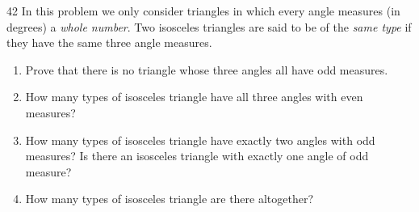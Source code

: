 \begin{probbox}{42}{}
In this problem we only consider triangles in which every angle measures (in degrees) a \emph{whole number}. Two isosceles triangles are said to be of the \emph{same type} if they have the same three angle measures.
\begin{enumerate}[label=\alph*),leftmargin=1.6em,itemsep=1pt]
\item Prove that there is no triangle whose three angles all have odd measures.
\item How many types of isosceles triangle have all three angles with even measures?
\item How many types of isosceles triangle have exactly two angles with odd measures? Is there an isosceles triangle with exactly one angle of odd measure?
\item How many types of isosceles triangle are there altogether?
\end{enumerate}
\end{probbox}
